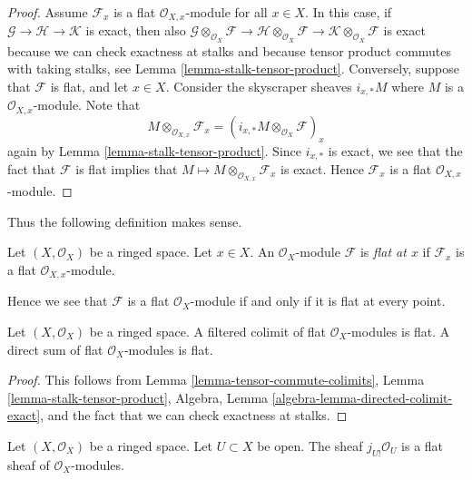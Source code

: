 \begin{proof}
Assume $\mathcal{F}_x$ is a flat $\mathcal{O}_{X, x}$-module for all
$x \in X$. In this case, if $\mathcal{G} \to \mathcal{H} \to \mathcal{K}$
is exact, then also
$\mathcal{G} \otimes_{\mathcal{O}_X} \mathcal{F} \to
\mathcal{H} \otimes_{\mathcal{O}_X} \mathcal{F} \to
\mathcal{K} \otimes_{\mathcal{O}_X} \mathcal{F}$
is exact because we can check exactness at stalks and because
tensor product commutes with taking stalks, see
Lemma \ref{lemma-stalk-tensor-product}.
Conversely, suppose that $\mathcal{F}$ is flat, and let $x \in X$.
Consider the skyscraper sheaves $i_{x, *} M$ where $M$ is a
$\mathcal{O}_{X, x}$-module. Note that
$$
M \otimes_{\mathcal{O}_{X, x}} \mathcal{F}_x =
\left(i_{x, *} M \otimes_{\mathcal{O}_X} \mathcal{F}\right)_x
$$
again by
Lemma \ref{lemma-stalk-tensor-product}.
Since $i_{x, *}$ is exact, we see that the fact that $\mathcal{F}$
is flat implies that $M \mapsto M \otimes_{\mathcal{O}_{X, x}} \mathcal{F}_x$
is exact. Hence $\mathcal{F}_x$ is a flat $\mathcal{O}_{X, x}$-module.
\end{proof}

\noindent
Thus the following definition makes sense.

\begin{definition}
\label{definition-flat-at-point}
Let $(X, \mathcal{O}_X)$ be a ringed space. Let $x \in X$.
An $\mathcal{O}_X$-module $\mathcal{F}$ is
{\it flat at $x$} if $\mathcal{F}_x$ is a flat
$\mathcal{O}_{X, x}$-module.
\end{definition}

\noindent
Hence we see that $\mathcal{F}$ is a flat $\mathcal{O}_X$-module
if and only if it is flat at every point.

\begin{lemma}
\label{lemma-colimits-flat}
Let $(X, \mathcal{O}_X)$ be a ringed space.
A filtered colimit of flat $\mathcal{O}_X$-modules is flat.
A direct sum of flat $\mathcal{O}_X$-modules is flat.
\end{lemma}

\begin{proof}
This follows from
Lemma \ref{lemma-tensor-commute-colimits},
Lemma \ref{lemma-stalk-tensor-product},
Algebra, Lemma \ref{algebra-lemma-directed-colimit-exact},
and the fact that we can check exactness at stalks.
\end{proof}

\begin{lemma}
\label{lemma-j-shriek-flat}
Let $(X, \mathcal{O}_X)$ be a ringed space.
Let $U \subset X$ be open. The sheaf $j_{U!}\mathcal{O}_U$
is a flat sheaf of $\mathcal{O}_X$-modules.
\end{lemma}

